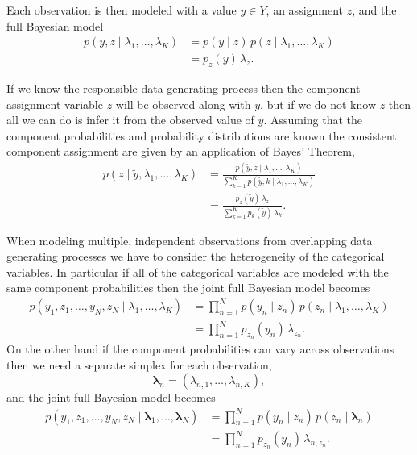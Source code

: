 \documentclass[
  letterpaper,
  DIV=11,
  numbers=noendperiod]{scrartcl}
\begin{document}
Each observation is then modeled with a value \(y \in Y\), an assignment
\(z\), and the full Bayesian model \begin{align*}
p(y, z \mid \lambda_{1}, \ldots, \lambda_{K})
&=
p(y \mid z) \, p(z \mid \lambda_{1}, \ldots, \lambda_{K})
\\
&=
p_{z}(y) \, \lambda_{z}.
\end{align*}

If we know the responsible data generating process then the component
assignment variable \(z\) will be observed along with \(y\), but if we
do not know \(z\) then all we can do is infer it from the observed value
of \(y\). Assuming that the component probabilities and probability
distributions are known the consistent component assignment are given by
an application of Bayes' Theorem, \begin{align*}
p(z \mid \tilde{y}, \lambda_{1}, \ldots, \lambda_{K})
&=
\frac{
  p(\tilde{y}, z \mid \lambda_{1}, \ldots, \lambda_{K})
}{
  \sum_{k = 1}^{K} p(\tilde{y}, k \mid \lambda_{1}, \ldots, \lambda_{K})
}
\\
&=
\frac{ p_{z}(\tilde{y}) \, \lambda_{z}}
{ \sum_{k = 1}^{K} p_{k}(\tilde{y}) \, \lambda_{k} }.
\end{align*}

When modeling multiple, independent observations from overlapping data
generating processes we have to consider the heterogeneity of the
categorical variables. In particular if all of the categorical variables
are modeled with the same component probabilities then the joint full
Bayesian model becomes \begin{align*}
p(y_{1}, z_{1}, \ldots, y_{N}, z_{N} \mid
  \lambda_{1}, \ldots, \lambda_{K})
&=
\prod_{n = 1}^{N}
p(y_{n} \mid z_{n}) \, p(z_{n} \mid \lambda_{1}, \ldots, \lambda_{K})
\\
&=
\prod_{n = 1}^{N}
p_{z_{n}}(y_{n}) \, \lambda_{z_{n}}.
\end{align*} On the other hand if the component probabilities can vary
across observations then we need a separate simplex for each
observation, \[
\boldsymbol{\lambda}_{n} = ( \lambda_{n, 1}, \ldots, \lambda_{n, K}),
\] and the joint full Bayesian model becomes \begin{align*}
p(y_{1}, z_{1}, \ldots, y_{N}, z_{N} \mid
  \boldsymbol{\lambda}_{1}, \ldots, \boldsymbol{\lambda}_{N})
&=
\prod_{n = 1}^{N}
p(y_{n} \mid z_{n}) \, p(z_{n} \mid \boldsymbol{\lambda}_{n})
\\
&=
\prod_{n = 1}^{N}
p_{z_{n}}(y_{n}) \, \lambda_{n, z_{n}}.
\end{align*}
\end{document}
